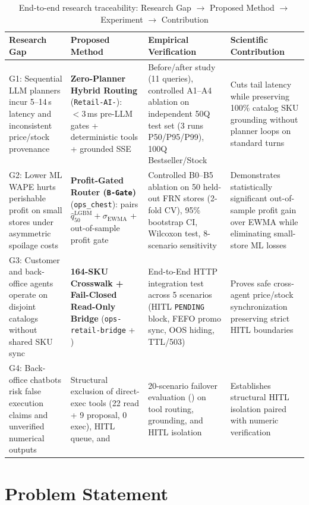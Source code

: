 \begin{table}[H]
\centering
\caption{End-to-end research traceability: Research Gap $\to$ Proposed Method $\to$ Experiment $\to$ Contribution}
\label{tab:gap_traceability}
\footnotesize
\begin{tabularx}{\textwidth}{L{3.1cm} L{3.3cm} L{3.6cm} Y}
\toprule
\textbf{Research Gap} & \textbf{Proposed Method} & \textbf{Empirical Verification} & \textbf{Scientific Contribution} \\
\midrule
G1: Sequential LLM planners incur 5--14\,s latency and inconsistent price/stock provenance & \textbf{Zero-Planner Hybrid Routing} (\texttt{Retail-AI-}): $<3$\,ms pre-LLM gates + deterministic tools + grounded SSE & Before/after study (11 queries), controlled A1--A4 ablation on independent 50Q test set (3 runs P50/P95/P99), 100Q Bestseller/Stock & Cuts tail latency while preserving 100\% catalog SKU grounding without planner loops on standard turns \\
G2: Lower ML WAPE hurts perishable profit on small stores under asymmetric spoilage costs & \textbf{Profit-Gated Router (\texttt{B-Gate})} (\texttt{ops\_chest}): pairs $\hat{q}_{50}^{\text{LGBM}} + \sigma_{\text{EWMA}}$ + out-of-sample profit gate & Controlled B0--B5 ablation on 50 held-out FRN stores (2-fold CV), 95\% bootstrap CI, Wilcoxon test, 8-scenario sensitivity & Demonstrates statistically significant out-of-sample profit gain over EWMA while eliminating small-store ML losses \\
G3: Customer and back-office agents operate on disjoint catalogs without shared SKU sync & \textbf{164-SKU Crosswalk + Fail-Closed Read-Only Bridge} (\texttt{ops-retail-bridge} + ) & End-to-End HTTP integration test across 5 scenarios (HITL \texttt{PENDING} block, FEFO promo sync, OOS hiding, TTL/503) & Proves safe cross-agent price/stock synchronization preserving strict HITL boundaries \\
G4: Back-office chatbots risk false execution claims and unverified numerical outputs & Structural exclusion of direct-exec tools (22 read + 9 proposal, 0 exec), HITL queue, and  & 20-scenario failover evaluation () on tool routing, grounding, and HITL isolation & Establishes structural HITL isolation paired with  numeric verification \\
\bottomrule
\end{tabularx}
\end{table}

\section{Problem Statement}

